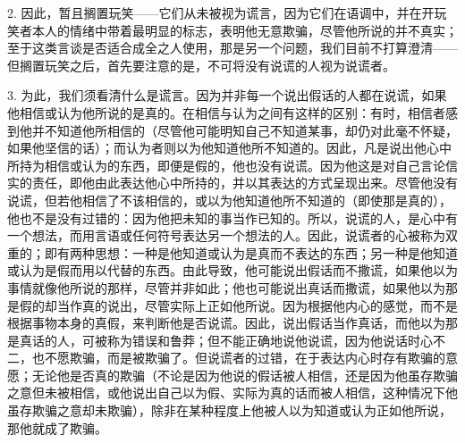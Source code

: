 2. 因此，暂且搁置玩笑——它们从未被视为谎言，因为它们在语调中，并在开玩笑者本人的情绪中带着最明显的标志，表明他无意欺骗，尽管他所说的并不真实；至于这类言谈是否适合成全之人使用，那是另一个问题，我们目前不打算澄清——但搁置玩笑之后，首先要注意的是，不可将没有说谎的人视为说谎者。\par

3. 为此，我们须看清什么是谎言。因为并非每一个说出假话的人都在说谎，如果他相信或认为他所说的是真的。在相信与认为之间有这样的区别：有时，相信者感到他并不知道他所相信的（尽管他可能明知自己不知道某事，却仍对此毫不怀疑，如果他坚信的话）；而认为者则以为他知道他所不知道的。因此，凡是说出他心中所持为相信或认为的东西，即便是假的，他也没有说谎。因为他这是对自己言论信实的责任，即他由此表达他心中所持的，并以其表达的方式呈现出来。尽管他没有说谎，但若他相信了不该相信的，或以为他知道他所不知道的（即使那是真的），他也不是没有过错的：因为他把未知的事当作已知的。所以，说谎的人，是心中有一个想法，而用言语或任何符号表达另一个想法的人。因此，说谎者的心被称为双重的；即有两种思想：一种是他知道或认为是真而不表达的东西；另一种是他知道或认为是假而用以代替的东西。由此导致，他可能说出假话而不撒谎，如果他以为事情就像他所说的那样，尽管并非如此；他也可能说出真话而撒谎，如果他以为那是假的却当作真的说出，尽管实际上正如他所说。因为根据他内心的感觉，而不是根据事物本身的真假，来判断他是否说谎。因此，说出假话当作真话，而他以为那是真话的人，可被称为错误和鲁莽；但不能正确地说他说谎，因为他说话时心不二，也不愿欺骗，而是被欺骗了。但说谎者的过错，在于表达内心时存有欺骗的意愿；无论他是否真的欺骗（不论是因为他说的假话被人相信，还是因为他虽存欺骗之意但未被相信，或他说出自己以为假、实际为真的话而被人相信，这种情况下他虽存欺骗之意却未欺骗），除非在某种程度上他被人以为知道或认为正如他所说，那他就成了欺骗。\par

